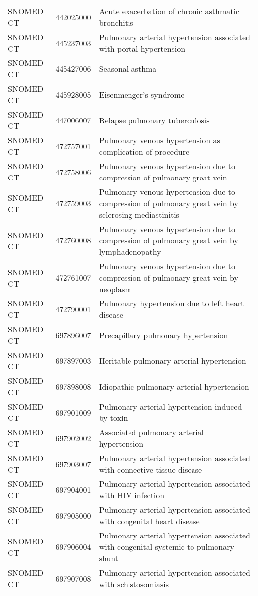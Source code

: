 \begin{table}[ht]
\begin{tabular}{lll}
  SNOMED CT & 442025000 & Acute exacerbation of chronic asthmatic bronchitis \\ 
  SNOMED CT & 445237003 & Pulmonary arterial hypertension associated with portal hypertension \\ 
  SNOMED CT & 445427006 & Seasonal asthma \\ 
  SNOMED CT & 445928005 & Eisenmenger's syndrome \\ 
  SNOMED CT & 447006007 & Relapse pulmonary tuberculosis \\ 
  SNOMED CT & 472757001 & Pulmonary venous hypertension as complication of procedure \\ 
  SNOMED CT & 472758006 & Pulmonary venous hypertension due to compression of pulmonary great vein \\ 
  SNOMED CT & 472759003 & Pulmonary venous hypertension due to compression of pulmonary great vein by sclerosing mediastinitis \\ 
  SNOMED CT & 472760008 & Pulmonary venous hypertension due to compression of pulmonary great vein by lymphadenopathy \\ 
  SNOMED CT & 472761007 & Pulmonary venous hypertension due to compression of pulmonary great vein by neoplasm \\ 
  SNOMED CT & 472790001 & Pulmonary hypertension due to left heart disease \\ 
  SNOMED CT & 697896007 & Precapillary pulmonary hypertension \\ 
  SNOMED CT & 697897003 & Heritable pulmonary arterial hypertension \\ 
  SNOMED CT & 697898008 & Idiopathic pulmonary arterial hypertension \\ 
  SNOMED CT & 697901009 & Pulmonary arterial hypertension induced by toxin \\ 
  SNOMED CT & 697902002 & Associated pulmonary arterial hypertension \\ 
  SNOMED CT & 697903007 & Pulmonary arterial hypertension associated with connective tissue disease \\ 
  SNOMED CT & 697904001 & Pulmonary arterial hypertension associated with HIV infection \\ 
  SNOMED CT & 697905000 & Pulmonary arterial hypertension associated with congenital heart disease \\ 
  SNOMED CT & 697906004 & Pulmonary arterial hypertension associated with congenital systemic-to-pulmonary shunt \\ 
  SNOMED CT & 697907008 & Pulmonary arterial hypertension associated with schistosomiasis \\ 

\end{tabular}
\end{table}
